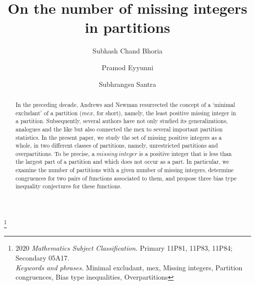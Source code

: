 \documentclass[12pt,reqno]{amsart}
\renewcommand{\(}{\left\(}
\renewcommand{\)}{\right\)}
\renewcommand{\[}{\left\[}
\renewcommand{\]}{\right\]}
\numberwithin{equation}{section}
\theoremstyle{plain}
\begin{document}
\title[On the number of missing integers in partitions]{On the number of missing integers in partitions}
\author{Subhash Chand Bhoria}
\address{Subhash Chand Bhoria, Department of Mathematics, Pt. Chiranji Lal Sharma Government College, Urban Estate, Sector-14, Karnal, Haryana - 132001, India.}

\author{Pramod Eyyunni}
\address{Pramod Eyyunni, Department of Mathematics,
Birla Institute of Technology and Science Pilani, Vidya vihar, Pilani, Rajasthan - 333031, India.} 
%

\author{Subhrangsu Santra}
\address{Subhrangsu Santra, Department of Mathematics,
Birla Institute of Technology and Science Pilani, Vidya vihar, Pilani, Rajasthan - 333031, India.} 

\thanks{$2020$ \textit{Mathematics Subject Classification.} Primary 11P81, 11P83, 11P84; Secondary 05A17. \\
\textit{Keywords and phrases.} Minimal excludant, mex, Missing integers, Partition congruences, Bias type inequalities, Overpartitions}

\begin{abstract}
In the preceding decade, Andrews and Newman resurrected the concept of a `minimal excludant' of a partition ($mex$, for short), namely, the least positive missing integer in a partition. Subsequently, several authors have not only studied its generalizations, analogues and the like but also connected the mex to several important partition statistics. In the present paper, we study the set of missing positive integers as a whole, in two different classes of partitions, namely, unrestricted partitions and overpartitions. To be precise, a $missing \ integer$ is a positive integer that is less than the largest part of a partition and which does not occur as a part. In particular, we examine the number of partitions with a given number of missing integers, determine congruences for two pairs of functions associated to them, and propose three bias type inequality conjectures for these functions.
\end{abstract}  
\maketitle
\end{document}
